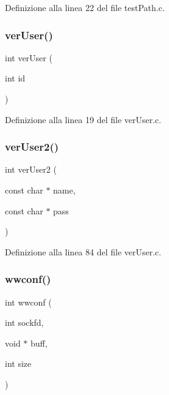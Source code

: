Definizione alla linea 22 del file test\+Path.\+c.

\mbox{\label{a00050_a068fcd7c3774c56f2fec08bd0e67b8eb}} 
\subsubsection{\texorpdfstring{verUser()}{verUser()}}
{\footnotesize\ttfamily int ver\+User (\begin{DoxyParamCaption}\item[{int}]{id }\end{DoxyParamCaption})}



Definizione alla linea 19 del file ver\+User.\+c.

\mbox{\label{a00050_afb6bcf6d0cbea179df5b49e8cfb1a4ae}} 
\subsubsection{\texorpdfstring{verUser2()}{verUser2()}}
{\footnotesize\ttfamily int ver\+User2 (\begin{DoxyParamCaption}\item[{const char $\ast$}]{name,  }\item[{const char $\ast$}]{pass }\end{DoxyParamCaption})}



Definizione alla linea 84 del file ver\+User.\+c.

\mbox{\label{a00050_a0ac2167e23f9cadb1367b63f38e421cc}} 
\subsubsection{\texorpdfstring{wwconf()}{wwconf()}}
{\footnotesize\ttfamily int wwconf (\begin{DoxyParamCaption}\item[{int}]{sockfd,  }\item[{void $\ast$}]{buff,  }\item[{int}]{size }\end{DoxyParamCaption})}



